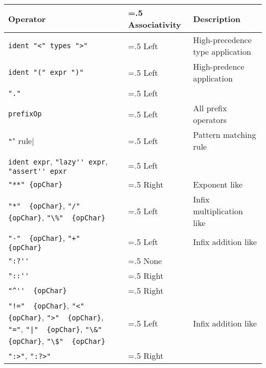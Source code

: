 \begin{table}[ht]
  \centering
  \begin{tabularx}{\linewidth}{|>{\hsize=1\hsize\raggedright\arraybackslash}X|>{\hsize=.5\hsize}X|>{\hsize=1.5\hsize}X|}
    \hline
    Operator & Associativity & Description\\
    \hline
    \lstinline[language=ebnf]|ident "<" types ">"| & Left & High-precedence type application\\
    \hline
    \lstinline[language=ebnf]|ident "(" expr ")"| & Left & High-predence application\\
    \hline
    \lstinline[language=ebnf]|"."| & Left & \\
    \hline
    \lstinline[language=ebnf]|prefixOp| & Left & All prefix operators\\
    \hline
    \lstinline[language=ebnf]|"|" rule| & Left & Pattern matching rule\\
    \hline
    \mbox{\lstinline[language=ebnf]|ident expr|,} \mbox{\lstinline[language=ebnf]|"lazy'' expr|,} \mbox{\lstinline[language=ebnf]|"assert'' epxr|} & Left & \\
    \hline
    \lstinline[language=ebnf]|"**" {opChar}| & Right & Exponent like\\
    \hline
    \mbox{\lstinline[language=ebnf]|"*"  {opChar}|,} \mbox{\lstinline[language=ebnf]|"/"  {opChar}|,} \mbox{\lstinline[language=ebnf]|"\%"  {opChar}|} & Left & Infix multiplication like\\
     \hline
    \mbox{\lstinline[language=ebnf]|"-"  {opChar}|,} \mbox{\lstinline[language=ebnf]|"+"  {opChar}|} & Left & Infix addition like\\
     \hline
     \lstinline[language=ebnf]|":?''| & None & \\
     \hline
     \lstinline[language=ebnf]|"::''| & Right & \\
     \hline
     \lstinline[language=ebnf]|"^''  {opChar}| & Right & \\
     \hline
    \mbox{\lstinline[language=ebnf]|"!="  {opChar}|,} \mbox{\lstinline[language=ebnf]|"<"  {opChar}|,} \mbox{\lstinline[language=ebnf]|">"  {opChar}|,} \mbox{\lstinline[language=ebnf]|"="|,} \mbox{\lstinline[language=ebnf]!"|"  {opChar}!,} \mbox{\lstinline[language=ebnf]|"\&"  {opChar}|,} \mbox{\lstinline[language=ebnf]|"\$"  {opChar}|} & Left & Infix addition like\\
     \hline
    \mbox{\lstinline[language=ebnf]|":>"|,} \mbox{\lstinline[language=ebnf]|":?>"|} & Right & \\

\end{tabularx}
\end{table}

